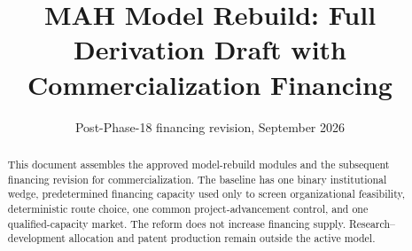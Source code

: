 \documentclass[11pt]{article}
\title{MAH Model Rebuild: Full Derivation Draft with Commercialization Financing}
\author{}
\date{Post-Phase-18 financing revision, September 2026}
\begin{document}
\maketitle

\begin{abstract}
This document assembles the approved model-rebuild modules and the subsequent
financing revision for commercialization. The baseline has one binary
institutional wedge, predetermined financing capacity used only to screen
organizational feasibility, deterministic route choice, one common
project-advancement control, and one qualified-capacity market. The reform
does not increase financing supply. Research--development allocation and
patent production remain outside the active model.
\end{abstract}

\tableofcontents













\end{document}
